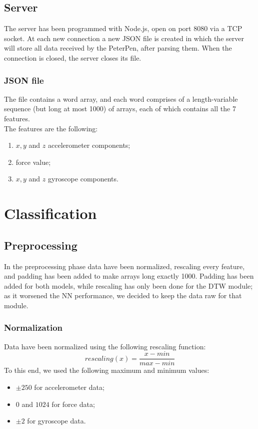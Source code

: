 \documentclass[8pt,notitlepage]{report}
\begin{document}
	\section{Server}
		The server has been programmed with Node.js, open on port 8080 via a TCP socket. At each new connection a new JSON file is created in which the server will store all data received by the PeterPen, after parsing them. When the connection is closed, the server closes its file. 
		
		\subsection{JSON file}
			The file contains a word array, and each word comprises of a length-variable sequence (but long at most 1000) of arrays, each of which contains all the 7 features. \\
			The features are the following:
			\begin{enumerate}
				\setlength\itemsep{.1em}
				\item $ x, y $ and $ z $ accelerometer components;
				\item force value;
				\item $ x, y $ and $ z $ gyroscope components.
			\end{enumerate}


\chapter{Classification}

	\section{Preprocessing}
		In the preprocessing phase data have been normalized, rescaling every feature, and padding has been added to make arrays long exactly 1000. Padding has been added for both models, while rescaling has only been done for the DTW module; as it worsened the NN performance, we decided to keep the data raw for that module. \\ 
		
		\subsection{Normalization}
			Data have been normalized using the following rescaling function: 
			\[ rescaling(x) = \frac{x - min}{max - min} \]
			To this end, we used the following maximum and minimum values:
			\begin{itemize}
				\setlength\itemsep{.01em}
				\item $ \pm 250 $ for accelerometer data;
				\item $ 0 $ and $ 1024 $ for force data;
				\item $ \pm 2 $ for gyroscope data.
			\end{itemize}
	
\end{document}
